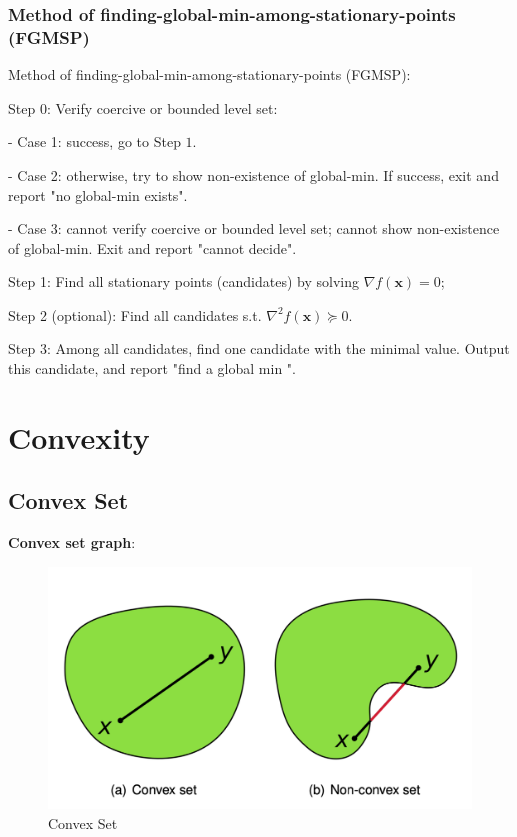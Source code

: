 \documentclass[11pt,a4paper]{article}
\begin{document}
\subsubsection{Method of finding-global-min-among-stationary-points (FGMSP)}
Method of finding-global-min-among-stationary-points (FGMSP):

Step 0: Verify coercive or bounded level set:

- Case 1: success, go to Step $1 .$

- Case 2: otherwise, try to show non-existence of global-min. If success, exit and report "no global-min exists".

- Case 3: cannot verify coercive or bounded level set; cannot show non-existence of global-min. Exit and report "cannot decide".

Step 1: Find all stationary points (candidates) by solving $\nabla f(\mathbf{x})=0$;

Step 2 (optional): Find all candidates s.t. $\nabla^{2} f(\mathbf{x}) \succeq 0$.

Step 3: Among all candidates, find one candidate with the minimal value. Output this candidate, and report "find a global $\mathrm{min}$ ".


\section{Convexity}
\subsection{Convex Set}
\begin{center}
\end{center}
\textbf{Convex set graph}:
\begin{center}\begin{figure}[htbp]
    \centering
    \includegraphics[scale=0.3]{Convex_set.png}
    \caption{Convex Set}
    \label{}
\end{figure}\end{center}
\end{document}
